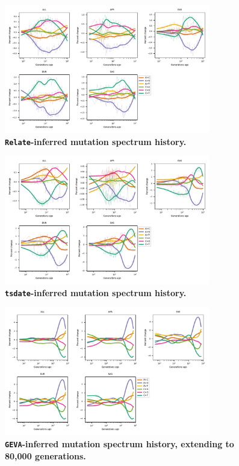 \documentclass[]{article}
\newcommand{\GEVA}{\texttt{GEVA}\xspace}
\newcommand{\tsdate}{\texttt{tsdate}\xspace}
\newcommand{\relate}{\texttt{Relate}\xspace}
\begin{document}
\begin{figure}[ht!]
    \centering
    \includegraphics[width=0.8\textwidth]{../plots/spectrum_history.relate.max_age.10000.pdf}
    \caption{
        \textbf{\relate-inferred mutation spectrum history.}
    }
    \label{fig:relate-spectra}
\end{figure}


\begin{figure}[ht!]
    \centering
    \includegraphics[width=0.8\textwidth]{../plots/spectrum_history.tsdate.max_age.10000.pdf}
    \caption{
        \textbf{\tsdate-inferred mutation spectrum history.}
    }
    \label{fig:tsdate-spectra}
\end{figure}

\begin{figure}[ht!]
    \centering
    \includegraphics[width=0.8\textwidth]{../plots/spectrum_history.geva.max_age.80000.pdf}
    \caption{
        \textbf{\GEVA-inferred mutation spectrum history, extending to 80,000 generations.}
    }
    \label{fig:geva-spectra-80k}
\end{figure}
\end{document}
